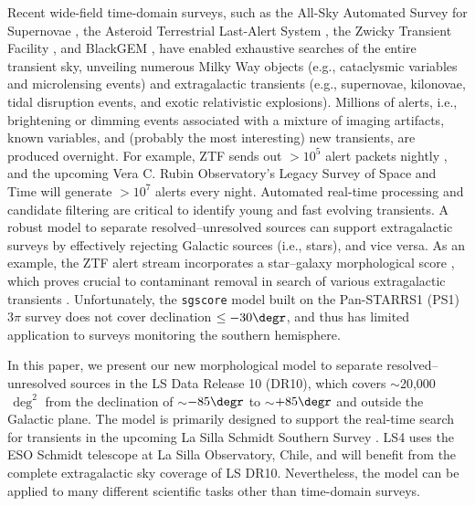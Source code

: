 \documentclass[twocolumn,tighten]{aastex631}
\newcommand{\dr}[1]{DR{#1}}
\begin{document}
\begin{CJK*}{UTF8}{gbsn}
Recent wide-field time-domain surveys, such as the All-Sky Automated Survey for Supernovae \citep{ASASSN_2014}, the Asteroid Terrestrial Last-Alert
System \citep{ATLAS_2011, ATLAS_2018},
the Zwicky Transient Facility \citep[ZTF;][]{ZTF_2019a, ZTF_2019b, ZTF_2020}, and BlackGEM \citep{BlackGEM_2024}, have enabled exhaustive searches of the entire transient sky, unveiling numerous Milky Way objects (e.g., cataclysmic variables and microlensing events) and extragalactic transients (e.g., supernovae, kilonovae, tidal disruption events, and exotic relativistic explosions). Millions of alerts, i.e., brightening or dimming events associated with a mixture of imaging artifacts, known variables, and (probably the most interesting) new transients, are produced overnight. For example, ZTF sends out $>$$10^5$ alert packets nightly \citep{ZTF_data_2019, ZTF_ML_2019}, and the upcoming Vera C. Rubin Observatory's Legacy Survey of Space and Time \citep[LSST;][]{LSST_2019} will generate $>$$10^7$ alerts every night. 
Automated real-time processing and candidate filtering are critical to identify young and fast evolving transients. A robust model to separate resolved--unresolved sources can support extragalactic surveys by effectively rejecting Galactic sources (i.e., stars), and vice versa. As an example, the ZTF alert stream incorporates a star--galaxy morphological score \citep[\texttt{sgscore};][ henceforth]{Tachibana_2018}, which proves crucial to contaminant removal in search of various extragalactic transients \citep[e.g.,][]{De_CLU_2020, BTS_I_2020, BTS_II_2020, ZTF_TDE_2021, Rehemtulla_2024}. Unfortunately, the \texttt{sgscore} model built on the Pan-STARRS1 (PS1) 3$\pi$ survey \citep{PanSTARRS_2016} does not cover declination $\le-30\degr$, and thus has limited application to surveys monitoring the southern hemisphere.

In this paper, we present our new morphological model to separate resolved--unresolved sources in the LS Data Release 10 (\dr{10}), which covers $\sim$20,000$\,\deg^2$ from the declination of $\sim$$-85\degr$ to $\sim$$+85\degr$ and outside the Galactic plane. The model is primarily designed to support the real-time search for transients in the upcoming La Silla Schmidt Southern Survey \citep{LS4_2025}. LS4 uses the ESO Schmidt telescope at La Silla Observatory, Chile, and will benefit from the complete extragalactic sky coverage of LS \dr{10}. Nevertheless, the model can be applied to many different scientific tasks other than time-domain surveys.


\end{CJK*}
\end{document}
